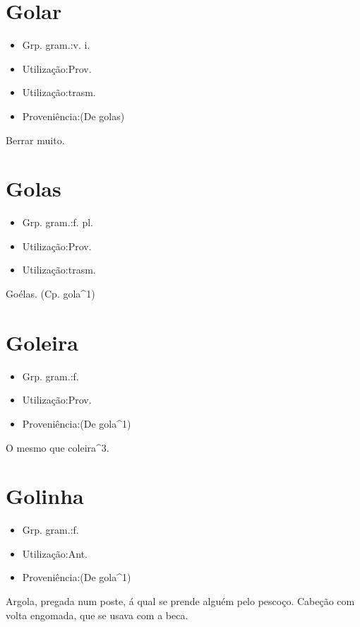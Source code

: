 \section{Golar}
\begin{itemize}
\item {Grp. gram.:v. i.}
\end{itemize}
\begin{itemize}
\item {Utilização:Prov.}
\end{itemize}
\begin{itemize}
\item {Utilização:trasm.}
\end{itemize}
\begin{itemize}
\item {Proveniência:(De \textunderscore golas\textunderscore )}
\end{itemize}
Berrar muito.
\section{Golas}
\begin{itemize}
\item {Grp. gram.:f. pl.}
\end{itemize}
\begin{itemize}
\item {Utilização:Prov.}
\end{itemize}
\begin{itemize}
\item {Utilização:trasm.}
\end{itemize}
Goélas.
(Cp. \textunderscore gola\textunderscore ^1)
\section{Goleira}
\begin{itemize}
\item {Grp. gram.:f.}
\end{itemize}
\begin{itemize}
\item {Utilização:Prov.}
\end{itemize}
\begin{itemize}
\item {Proveniência:(De \textunderscore gola\textunderscore ^1)}
\end{itemize}
O mesmo que \textunderscore coleira\textunderscore ^3.
\section{Golinha}
\begin{itemize}
\item {Grp. gram.:f.}
\end{itemize}
\begin{itemize}
\item {Utilização:Ant.}
\end{itemize}
\begin{itemize}
\item {Proveniência:(De \textunderscore gola\textunderscore ^1)}
\end{itemize}
Argola, pregada num poste, á qual se prende alguém pelo pescoço.
Cabeção com volta engomada, que se usava com a beca.
